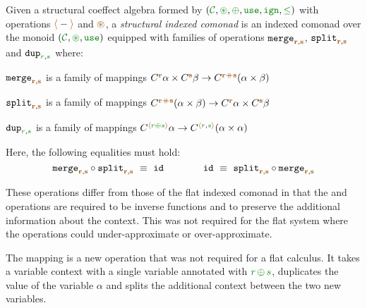 \begin{definition}
Given a structural coeffect algebra formed by $(\C, \cseq, \cpar, \cunit, \czero, \cleq)$
with operations $\alift{-}$ and $\aseq$, a \emph{structural indexed comonad} is an indexed comonad over
the monoid $(\C, \cseq, \cunit)$ equipped with families of operations $\ident{merge}_{\aclrd{\textbf{r}},\aclrd{\textbf{s}}}$,
$\ident{split}_{\aclrd{\textbf{r}},\aclrd{\textbf{s}}}$ and $\ident{dup}_{\cclrd{r}, \cclrd{s}}$ where:
%
\begin{compactitem}
\item $\ident{merge}_{\aclrd{\textbf{r}},\aclrd{\textbf{s}}}$ is a family of mappings
  $\ctyp{\aclrd{\textbf{r}}}{\alpha} \times \ctyp{\aclrd{\textbf{s}}}{\beta} \rightarrow \ctyp{\aclrd{\textbf{r}}\atimes\aclrd{\textbf{s}}}{(\alpha \times \beta)}$
\item $\ident{split}_{\aclrd{\textbf{r}},\aclrd{\textbf{s}}}$ is a family of mappings
  $\ctyp{\aclrd{\textbf{r}}\atimes\aclrd{\textbf{s}}}{(\alpha \times \beta)} \rightarrow \ctyp{\aclrd{\textbf{r}}}{\alpha} \times \ctyp{\aclrd{\textbf{s}}}{\beta}$
\item $\ident{dup}_{\cclrd{r}, \cclrd{s}}$ is a family of mappings
  $\ctyp{\alift{\cclrd{r} \cpar \cclrd{s}}}{\alpha} \rightarrow \ctyp{\alift{\cclrd{r}, \cclrd{s}}}{(\alpha \times \alpha)}$
\end{compactitem}
%
Here, the following equalities must hold:
\begin{equation*}
\ident{merge}_{\aclrd{\textbf{r}},\aclrd{\textbf{s}}} \circ \ident{split}_{\aclrd{\textbf{r}},\aclrd{\textbf{s}}} ~\equiv~ \ident{id} \qquad\qquad
\ident{id} ~\equiv~ \ident{split}_{\aclrd{\textbf{r}},\aclrd{\textbf{s}}} \circ \ident{merge}_{\aclrd{\textbf{r}},\aclrd{\textbf{s}}}
\end{equation*}

\end{definition}

\noindent
These operations differ from those of the flat indexed comonad in that the  and
 operations are required to be inverse functions and to preserve the additional
information about the context. This was not required for the flat system where the operations
could under-approximate or over-approximate. 

The  mapping is a new operation that was not required for a flat calculus. It
takes a variable context with a single variable annotated with $\cclrd{r}\,\cpar\,\cclrd{s}$,
duplicates the value of the variable $\alpha$ and splits the additional context between the two
new variables.

